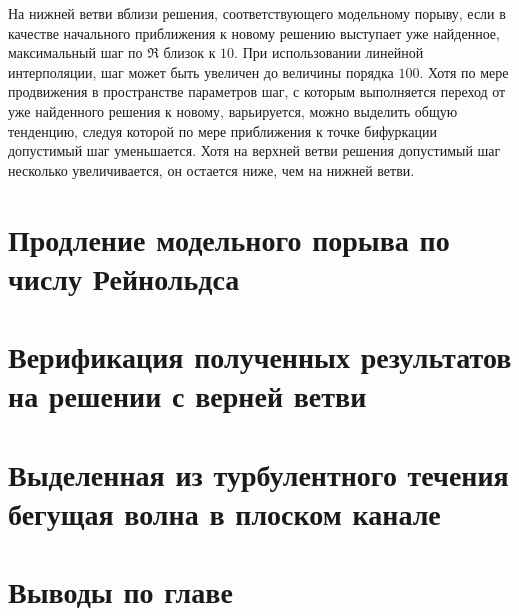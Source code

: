 На нижней ветви вблизи решения, соответствующего модельному порыву, если в качестве начального приближения к новому решению выступает уже найденное, максимальный шаг по $\Re$ близок к $10$. При использовании линейной интерполяции, шаг может быть увеличен до величины порядка $100$. Хотя по мере продвижения в пространстве параметров шаг, с которым выполняется переход от уже найденного решения к новому, варьируется, можно выделить общую тенденцию, следуя которой по мере приближения к точке бифуркации допустимый шаг уменьшается. Хотя на верхней ветви решения допустимый шаг несколько увеличивается, он остается ниже, чем на нижней ветви. 
 

\section{Продление модельного порыва по числу Рейнольдса}

\section{Верификация полученных результатов на решении с верней ветви}

\section{Выделенная из турбулентного течения бегущая волна в плоском канале}

\section{Выводы по главе}


